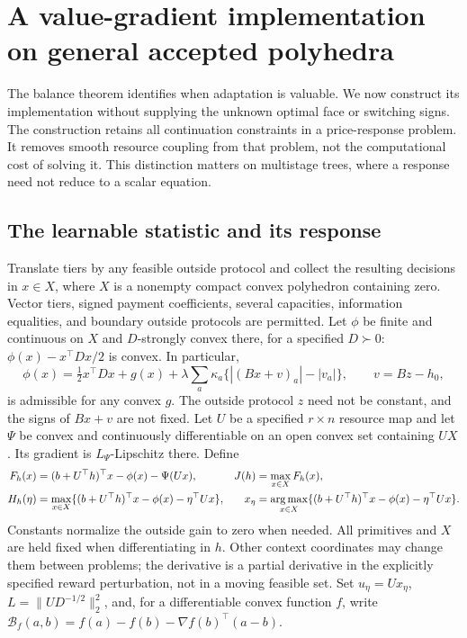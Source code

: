 \section{A value-gradient implementation on general accepted polyhedra}\label{sec:r19-bridge}
The balance theorem identifies when adaptation is valuable. We now construct its implementation without supplying the unknown optimal face or switching signs. The construction retains all continuation constraints in a price-response problem. It removes smooth resource coupling from that problem, not the computational cost of solving it. This distinction matters on multistage trees, where a response need not reduce to a scalar equation.

\subsection{The learnable statistic and its response}
Translate tiers by any feasible outside protocol and collect the resulting decisions in $x\in X$, where $X$ is a nonempty compact convex polyhedron containing zero. Vector tiers, signed payment coefficients, several capacities, information equalities, and boundary outside protocols are permitted. Let $\phi$ be finite and continuous on $X$ and $D$-strongly convex there, for a specified $D\succ0$: $\phi(x)-x^\top Dx/2$ is convex. In particular,
\[
 \phi(x)=\tfrac12x^\top Dx+g(x)
       +\lambda\sum_a\kappa_a\{|(Bx+v)_a|-|v_a|\},
 \qquad v=Bz-h_0,
\]
is admissible for any convex $g$. The outside protocol $z$ need not be constant, and the signs of $Bx+v$ are not fixed. Let $U$ be a specified $r\times n$ resource map and let $\Psi$ be convex and continuously differentiable on an open convex set containing $UX$. Its gradient is $L_\Psi$-Lipschitz there. Define
\begin{align}
 F_h(x)&=(b+U^\top h)^\top x-\phi(x)-\Psi(Ux), &
 J(h)&=\max_{x\in X}F_h(x),\label{eq:r19-program}\\
 H_h(\eta)&=\max_{x\in X}\{(b+U^\top h)^\top x-\phi(x)-\eta^\top Ux\},&
 x_\eta&=\operatorname*{arg\,max}_{x\in X}\{(b+U^\top h)^\top x-\phi(x)-\eta^\top Ux\}.
 \label{eq:r19-response}
\end{align}
Constants normalize the outside gain to zero when needed. All primitives and $X$ are held fixed when differentiating in $h$. Other context coordinates may change them between problems; the derivative is a partial derivative in the explicitly specified reward perturbation, not in a moving feasible set. Set $u_\eta=Ux_\eta$, $L=\|UD^{-1/2}\|_2^2$, and, for a differentiable convex function $f$, write
$\mathcal B_f(a,b)=f(a)-f(b)-\nabla f(b)^\top(a-b)$.


